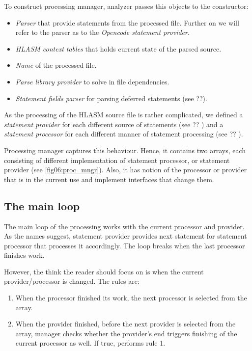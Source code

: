 To construct processing manager, analyzer passes this objects to the constructor:
\begin{itemize}
	\item \emph{Parser} that provide statements from the processed file. Further on we will refer to the parser as to the \emph{Opencode statement provider}.
	\item \emph{HLASM context tables} that holds current state of the parsed source.
	\item \emph{Name} of the processed file.
	\item \emph{Parse library provider} to solve in file dependencies.
	\item \emph{Statement fields parser} for parsing deferred statements (see ??). 
\end{itemize}

As the processing of the HLASM source file is rather complicated, we defined a \emph{statement provider} for each different source of statements (see ?? ) and a \emph{statement processor} for each different manner of statement processing (see ?? ). 

Processing manager captures this behaviour. Hence, it contains two arrays, each consisting of different implementation of statement processor, or statement provider (see \cref{fig06:proc_mngr}).  Also, it has notion of the processor or provider that is in the current use and implement interfaces that change them.

\subsection{The main loop}

The main loop of the processing works with the current processor and provider. As the names suggest, statement provider provides next statement for statement processor that processes it accordingly. The loop breaks when the last processor finishes work.

However, the think the reader should focus on is when the current provider/processor is changed. The rules are:

\begin{enumerate}
	\item When the processor finished its work, the next processor is selected from the array.
	\item When the provider finished, before the next provider is selected from the array, manager checks whether the provider's end triggers finishing of the current processor as well. If true, performs rule 1.
\end{enumerate}

